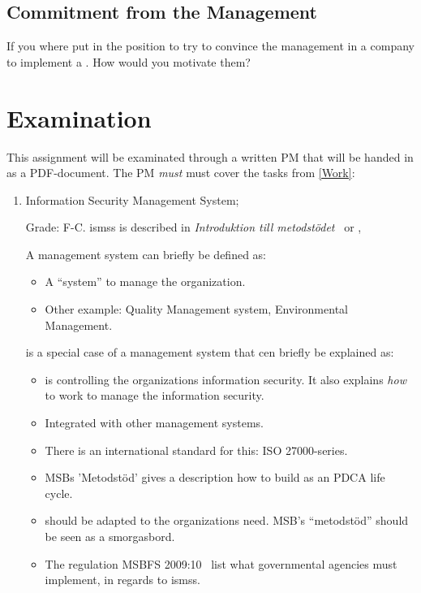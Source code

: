 \documentclass[a4paper]{llncs}
\begin{document}
\subsection{Commitment from the Management}
If you where put in the position to try to convince the management in a company
to implement a . How would you motivate them?

\section{Examination}
\label{sec:examination}

This assignment will be examinated through a written PM that will be handed in
as a PDF-document.
The PM \emph{must} must cover the tasks from \cref{Work}:

\begin{enumerate}
  \item Information Security Management System;
    \begin{solution}
      Grade: F-C.
      \acp{isms} is described in \emph{Introduktion till 
        metodstödet}~\cite{MSB2011itm} or \cite[chap. 3]{iso27000},

      A management system can briefly be defined as:
      \begin{itemize}
        \item A \enquote{system} to manage the organization.
        \item Other example: Quality Management system, Environmental Management.
      \end{itemize}

       is a special case of a management system that cen briefly be
      explained as:
      \begin{itemize}
        \item {} is controlling the organizations information
          security. It also explains \emph{how} to work to manage the
          information security.

        \item Integrated with other management systems.
        \item There is an international standard for this: ISO 27000-series.
        \item MSBs 'Metodstöd' gives a description how to build  as
          an PDCA life cycle.
        \item {} should be adapted to the organizations need. MSB's
          \enquote{metodstöd} should be seen as a smorgasbord.
        \item The regulation MSBFS 2009:10~\cite{MSBFS2009:10} list what
          governmental agencies must implement, in regards to \acp{isms}.
      \end{itemize}
    \end{solution}


\end{enumerate}
\end{document}
